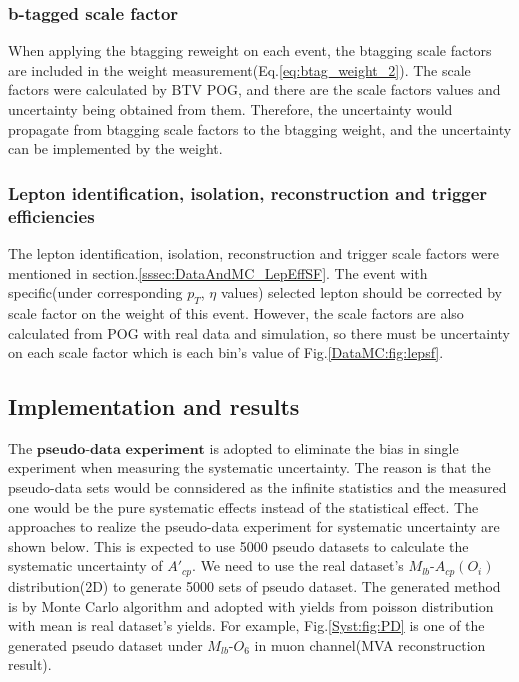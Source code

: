 		\subsubsection{   b-tagged scale factor}
		\label{sssec:Syst_btag}

			When applying the btagging reweight on each event, the btagging scale factors are included in the weight measurement(Eq.\ref{eq:btag_weight_2}). The scale factors were calculated by BTV POG, and there are the scale factors values and uncertainty being obtained from them. Therefore, the uncertainty would propagate from btagging scale factors to the btagging weight, and the uncertainty can be implemented by the weight.

		\subsubsection{   Lepton identification, isolation, reconstruction and trigger efficiencies}
		\label{sssec:Syst_lepsf}

			The lepton identification, isolation, reconstruction and trigger scale factors were mentioned in section.\ref{sssec:DataAndMC_LepEffSF}. The event with specific(under corresponding $p_T$, $\eta$ values) selected lepton should be corrected by scale factor on the weight of this event. However, the scale factors are also calculated from POG with real data and simulation, so there must be uncertainty on each scale factor which is each bin's value of Fig.\ref{DataMC:fig:lepsf}.

	\subsection{   Implementation and results}
	\label{ssec:Syst_imp_result}

		The $\textbf{pseudo-data experiment}$ is adopted to eliminate the bias in single experiment when measuring the systematic uncertainty. The reason is that the pseudo-data sets would be connsidered as the infinite statistics and the measured one would be the pure systematic effects instead of the statistical effect. The approaches to realize the pseudo-data experiment for systematic uncertainty are shown below. This is expected to use 5000 pseudo datasets to calculate the systematic uncertainty of $A'_{cp}$. We need to use the real dataset's $M_{lb}$-$A_{cp}(O_i)$ distribution(2D) to generate 5000 sets of pseudo dataset. The generated method is by Monte Carlo algorithm and adopted with yields from poisson distribution with mean is real dataset's yields. For example, Fig.\ref{Syst:fig:PD} is one of the generated pseudo dataset under $M_{lb}$-$O_{6}$ in muon channel(MVA reconstruction result). 

